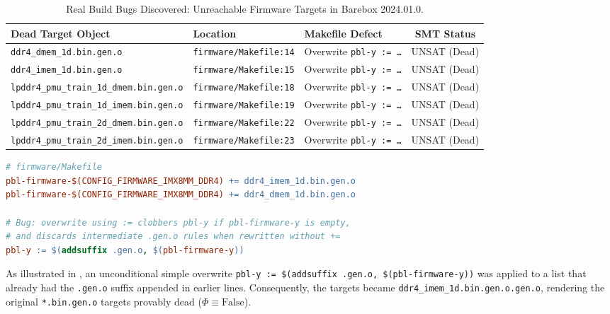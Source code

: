 \documentclass[acmsmall,screen,review]{acmart}
\begin{document}
\begin{table}[t]
\centering
\footnotesize
\setlength{\tabcolsep}{3pt}
\caption{Real Build Bugs Discovered: Unreachable Firmware Targets in Barebox 2024.01.0.}
\label{tab:dead-targets}
\begin{tabular}{lllc}
\toprule
\textbf{Dead Target Object} & \textbf{Location} & \textbf{Makefile Defect} & \textbf{SMT Status} \\
\midrule
\texttt{ddr4\_dmem\_1d.bin.gen.o} & \texttt{firmware/Makefile:14} & Overwrite \texttt{pbl-y := \dots} & UNSAT (Dead) \\
\texttt{ddr4\_imem\_1d.bin.gen.o} & \texttt{firmware/Makefile:15} & Overwrite \texttt{pbl-y := \dots} & UNSAT (Dead) \\
\texttt{lpddr4\_pmu\_train\_1d\_dmem.bin.gen.o} & \texttt{firmware/Makefile:18} & Overwrite \texttt{pbl-y := \dots} & UNSAT (Dead) \\
\texttt{lpddr4\_pmu\_train\_1d\_imem.bin.gen.o} & \texttt{firmware/Makefile:19} & Overwrite \texttt{pbl-y := \dots} & UNSAT (Dead) \\
\texttt{lpddr4\_pmu\_train\_2d\_dmem.bin.gen.o} & \texttt{firmware/Makefile:22} & Overwrite \texttt{pbl-y := \dots} & UNSAT (Dead) \\
\texttt{lpddr4\_pmu\_train\_2d\_imem.bin.gen.o} & \texttt{firmware/Makefile:23} & Overwrite \texttt{pbl-y := \dots} & UNSAT (Dead) \\
\bottomrule
\end{tabular}
\end{table}

\begin{lstlisting}[language=make,caption={Buggy snippet in Barebox \texttt{firmware/Makefile} causing 6 dead firmware objects.},label={lst:barebox-bug}]
# firmware/Makefile
pbl-firmware-$(CONFIG_FIRMWARE_IMX8MM_DDR4) += ddr4_imem_1d.bin.gen.o
pbl-firmware-$(CONFIG_FIRMWARE_IMX8MM_DDR4) += ddr4_dmem_1d.bin.gen.o

# Bug: overwrite using := clobbers pbl-y if pbl-firmware-y is empty,
# and discards intermediate .gen.o rules when rewritten without +=
pbl-y := $(addsuffix .gen.o, $(pbl-firmware-y))
\end{lstlisting}

As illustrated in , an unconditional simple overwrite \texttt{pbl-y := \$(addsuffix .gen.o, \$(pbl-firmware-y))} was applied to a list that already had the \texttt{.gen.o} suffix appended in earlier lines. Consequently, the targets became \texttt{ddr4\_imem\_1d.bin.gen.o.gen.o}, rendering the original \texttt{*.bin.gen.o} targets provably dead ($\Phi \equiv \text{False}$).
\end{document}
